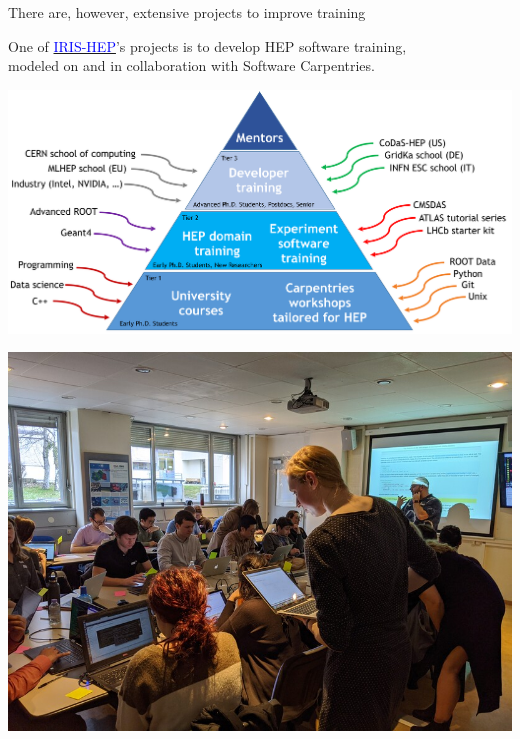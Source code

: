 \documentclass[aspectratio=169]{beamer}
\begin{document}
\begin{frame}{There are, however, extensive projects to improve training}
\vspace{0.25 cm}

One of \href{https://iris-hep.org/}{\textcolor{blue}{IRIS-HEP}}'s projects is to develop HEP software training, \\ modeled on and in collaboration with Software Carpentries.

\mbox{\hspace{-0.75 cm}\includegraphics[width=\linewidth]{PLOTS/Training-Pyramid.png}}

\vspace{-7.75 cm}
\hfill \mbox{\includegraphics[width=4 cm]{PLOTS/instructor_mentor_small.jpg}\hspace{-1 cm}}
\vspace{7.75 cm}
\end{frame}
\end{document}
